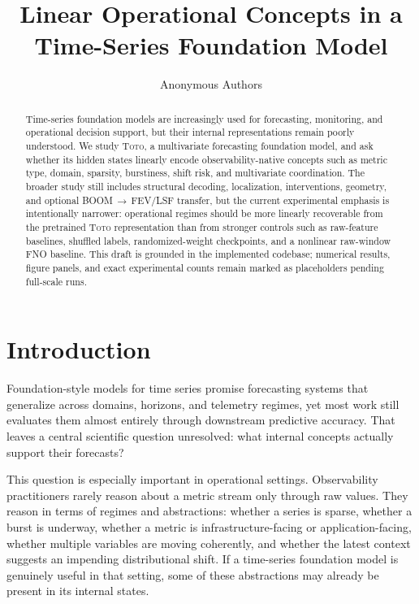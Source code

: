 \documentclass{article}
\title{Linear Operational Concepts in a Time-Series Foundation Model}
\author{Anonymous Authors}
\newcommand{\model}{\textsc{Toto}}
\newcommand{\boom}{\textsc{BOOM}}
\newcommand{\fev}{\textsc{FEV}}
\newcommand{\lsf}{\textsc{LSF}}
\begin{document}
\maketitle

\begin{abstract}
Time-series foundation models are increasingly used for forecasting, monitoring, and operational decision support, but their internal representations remain poorly understood. We study \model{}, a multivariate forecasting foundation model, and ask whether its hidden states linearly encode observability-native concepts such as metric type, domain, sparsity, burstiness, shift risk, and multivariate coordination. The broader study still includes structural decoding, localization, interventions, geometry, and optional \boom{}\,$\rightarrow$\,\fev{}/\lsf{} transfer, but the current experimental emphasis is intentionally narrower: operational regimes should be more linearly recoverable from the pretrained \model{} representation than from stronger controls such as raw-feature baselines, shuffled labels, randomized-weight checkpoints, and a nonlinear raw-window FNO baseline. This draft is grounded in the implemented codebase; numerical results, figure panels, and exact experimental counts remain marked as placeholders pending full-scale runs.
\end{abstract}

\section{Introduction}

Foundation-style models for time series promise forecasting systems that generalize across domains, horizons, and telemetry regimes, yet most work still evaluates them almost entirely through downstream predictive accuracy. That leaves a central scientific question unresolved: what internal concepts actually support their forecasts?

This question is especially important in operational settings. Observability practitioners rarely reason about a metric stream only through raw values. They reason in terms of regimes and abstractions: whether a series is sparse, whether a burst is underway, whether a metric is infrastructure-facing or application-facing, whether multiple variables are moving coherently, and whether the latest context suggests an impending distributional shift. If a time-series foundation model is genuinely useful in that setting, some of these abstractions may already be present in its internal states.
\end{document}
